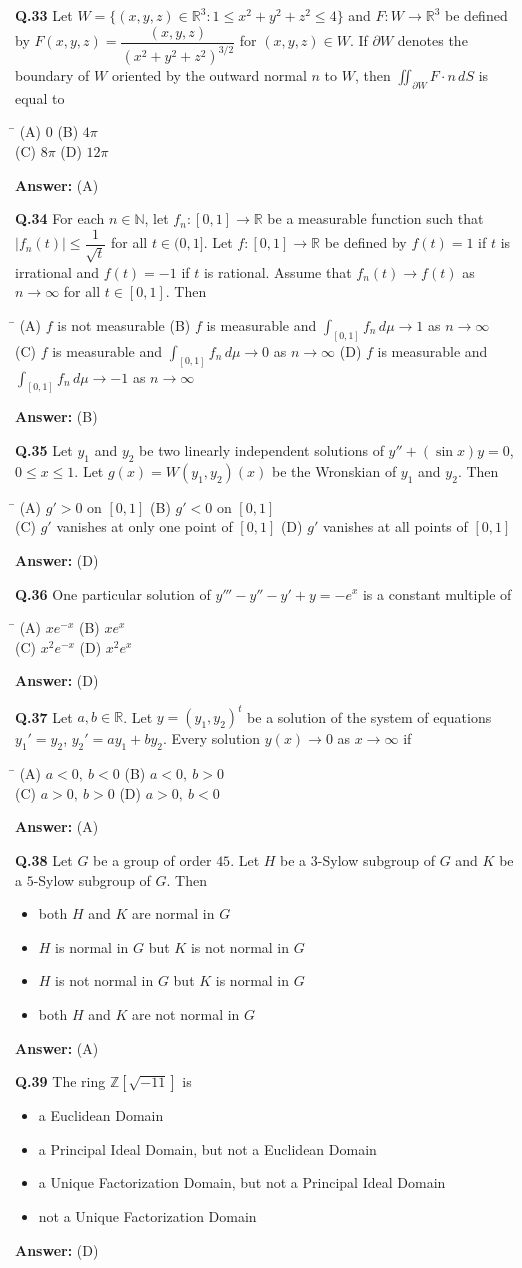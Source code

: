 \documentclass[11pt,a4paper]{article}
\newcommand{\optsfourA}[4]{%
  \begin{tabbing}
    \hspace{0.48\linewidth}\=\kill
    (A) #1 \> (B) #2 \\[2pt]
    (C) #3 \> (D) #4
  \end{tabbing}%
}
\newcommand{\optslistA}[4]{%
  \begin{itemize}
    \setlength{\itemsep}{2pt}\setlength{\parskip}{0pt}
    \item[(A)] #1
    \item[(B)] #2
    \item[(C)] #3
    \item[(D)] #4
  \end{itemize}%
}
\newcommand{\ans}[1]{\textbf{Answer:} #1\par\medskip}
\begin{document}
\textbf{Q.33} Let $W = \{(x,y,z) \in \mathbb{R}^3 : 1 \le x^2 + y^2 + z^2 \le 4\}$ and $F : W \to \mathbb{R}^3$ be defined by $F(x,y,z) = \dfrac{(x,y,z)}{(x^2 + y^2 + z^2)^{3/2}}$ for $(x,y,z) \in W$. If $\partial W$ denotes the boundary of $W$ oriented by the outward normal $n$ to $W$, then $\displaystyle\iint_{\partial W} F \cdot n\,dS$ is equal to
\optsfourA{$0$}{$4\pi$}{$8\pi$}{$12\pi$}
\ans{(A)}

\textbf{Q.34} For each $n \in \mathbb{N}$, let $f_n : [0, 1] \to \mathbb{R}$ be a measurable function such that $|f_n(t)| \le \dfrac{1}{\sqrt{t}}$ for all $t \in (0, 1]$. Let $f : [0, 1] \to \mathbb{R}$ be defined by $f(t) = 1$ if $t$ is irrational and $f(t) = -1$ if $t$ is rational. Assume that $f_n(t) \to f(t)$ as $n \to \infty$ for all $t \in [0, 1]$. Then
\optsfourA{$f$ is not measurable}{$f$ is measurable and $\displaystyle\int_{[0,1]} f_n\,d\mu \to 1$ as $n \to \infty$}{$f$ is measurable and $\displaystyle\int_{[0,1]} f_n\,d\mu \to 0$ as $n \to \infty$}{$f$ is measurable and $\displaystyle\int_{[0,1]} f_n\,d\mu \to -1$ as $n \to \infty$}
\ans{(B)}

\textbf{Q.35} Let $y_1$ and $y_2$ be two linearly independent solutions of $y'' + (\sin x)y = 0$, $0 \le x \le 1$. Let $g(x) = W(y_1, y_2)(x)$ be the Wronskian of $y_1$ and $y_2$. Then
\optsfourA{$g' > 0$ on $[0, 1]$}{$g' < 0$ on $[0, 1]$}{$g'$ vanishes at only one point of $[0, 1]$}{$g'$ vanishes at all points of $[0, 1]$}
\ans{(D)}

\textbf{Q.36} One particular solution of $y''' - y'' - y' + y = -e^x$ is a constant multiple of
\optsfourA{$x e^{-x}$}{$x e^x$}{$x^2 e^{-x}$}{$x^2 e^x$}
\ans{(D)}

\textbf{Q.37} Let $a, b \in \mathbb{R}$. Let $y = (y_1, y_2)^t$ be a solution of the system of equations $y_1' = y_2$, $y_2' = a y_1 + b y_2$. Every solution $y(x) \to 0$ as $x \to \infty$ if
\optsfourA{$a < 0,\ b < 0$}{$a < 0,\ b > 0$}{$a > 0,\ b > 0$}{$a > 0,\ b < 0$}
\ans{(A)}

\textbf{Q.38} Let $G$ be a group of order $45$. Let $H$ be a $3$-Sylow subgroup of $G$ and $K$ be a $5$-Sylow subgroup of $G$. Then
\optslistA{both $H$ and $K$ are normal in $G$}{$H$ is normal in $G$ but $K$ is not normal in $G$}{$H$ is not normal in $G$ but $K$ is normal in $G$}{both $H$ and $K$ are not normal in $G$}
\ans{(A)}

\textbf{Q.39} The ring $\mathbb{Z}[\sqrt{-11}]$ is
\optslistA{a Euclidean Domain}{a Principal Ideal Domain, but not a Euclidean Domain}{a Unique Factorization Domain, but not a Principal Ideal Domain}{not a Unique Factorization Domain}
\ans{(D)}
\end{document}
